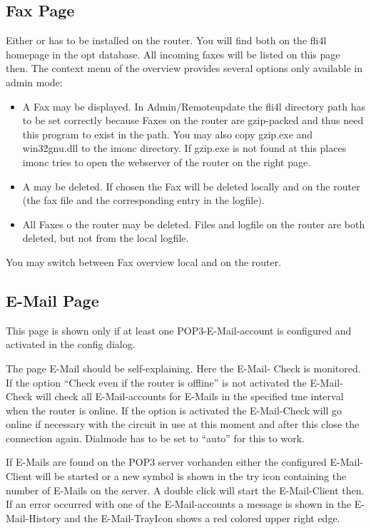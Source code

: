   \subsection{Fax Page}

  Either  or  has to be installed
  on the router. You will find both on the fli4l homepage in the opt database.
  All incoming faxes will be listed on this page then. The context menu
  of the overview provides several options only available in admin mode:

  \begin{itemize}
  \item A Fax may be displayed. In Admin/Remoteupdate the fli4l directory
    path has to be set correctly because Faxes on the router are gzip-packed
    and thus need this program to exist in the path. You may also copy
    gzip.exe and win32gnu.dll to the imonc directory. If gzip.exe is not
    found at this places imonc tries to open the webserver of the router
    on the right page.
  \item A may be deleted. If chosen the Fax will be deleted locally
    and on the router (the fax file and the corresponding entry in the logfile).
  \item All Faxes o the router may be deleted. Files and logfile on the
    router are both deleted, but not from the local logfile.
  \end{itemize}
  You may switch between Fax overview local  and on the router.

  \subsection{E-Mail Page}

  This page is shown only if at least one POP3-\mbox{E-Mail}-account is
  configured and activated in the config dialog.

  The page \mbox{E-Mail} should be self-explaining. Here the \mbox{E-Mail}-
  Check is monitored. If the option ``Check even if the router is offline''
  is not activated the \mbox{E-Mail}-Check will check all \mbox{E-Mail}-accounts
  for \mbox{E-Mails} in the specified tme interval when the router is online.
  If the option is activated the \mbox{E-Mail}-Check will go online if necessary
  with the circuit in use at this moment and after this close the connection
  again. Dialmode has to be set to ``auto'' for this to work.

  If \mbox{E-Mails} are found on the POP3 server vorhanden either the configured
  \mbox{E-Mail}-Client will be started or a new symbol is shown in the try icon
  containing the number of \mbox{E-Mails} on the server. A double click will
  start the \mbox{E-Mail}-Client then. If an error occurred with one of the
  \mbox{E-Mail}-accounts a message is shown in the \mbox{E-Mail}-History and
  the \mbox{E-Mail}-TrayIcon shows a red colored upper right edge.

